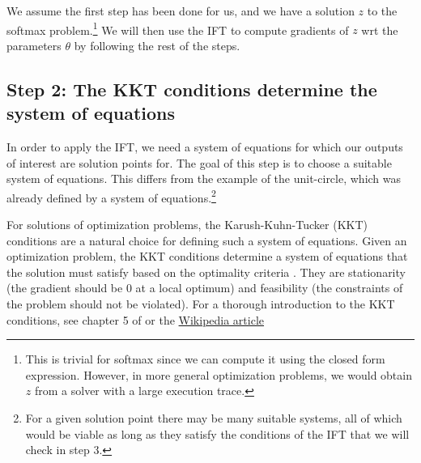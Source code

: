 \documentclass[11pt]{article}
\begin{document}
We assume the first step has been done for us,
and we have a solution $z$ to the softmax problem.\footnote{
This is trivial for softmax since we can compute it using the closed form
expression.
However, in more general optimization problems, we would obtain $z$ from a solver
with a large execution trace.}
We will then use the IFT to compute gradients of $z$ wrt the parameters $\theta$
by following the rest of the steps.

\subsection*{Step 2: The KKT conditions determine the system of equations}
In order to apply the IFT,
we need a system of equations for which our outputs of interest are solution points for.
The goal of this step is to choose a suitable system of equations.
This differs from the example of the unit-circle, which was already defined by
a system of equations.\footnote{
For a given solution point there may be many suitable systems,
all of which would be viable as long as they satisfy
the conditions of the IFT that we will check in step 3.
}

For solutions of optimization problems, the Karush-Kuhn-Tucker (KKT) conditions
are a natural choice for defining such a system of equations.
Given an optimization problem, the KKT conditions
determine a system of equations that the solution must satisfy
based on the optimality criteria \citep{kkt-thesis,kkt}.
They are stationarity (the gradient should be 0 at a local optimum)
and feasibility (the constraints of the problem should not be violated).
For a thorough introduction to the KKT conditions, see chapter 5 of \citet{bv-cvxbook}
or the \href{https://en.wikipedia.org/wiki/Karush-Kuhn-Tucker\_conditions}{Wikipedia article}
\end{document}
